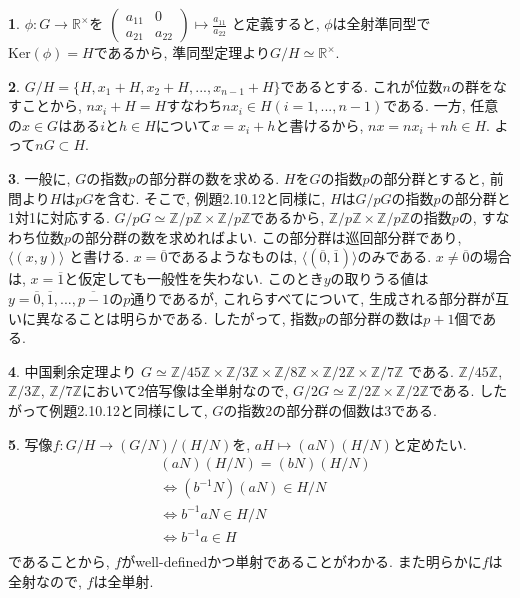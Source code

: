 \documentclass{article}
\theoremstyle{definition}
\newtheorem{ans}{}
\numberwithin{ans}{subsection}
\newcommand{\Z}[1]{\mathbb{Z}/#1\mathbb{Z}}
\newcommand{\Ker}[1]{\mathrm{Ker}(#1)}
\begin{document}
\begin{ans}
  $\phi: G \rightarrow \mathbb{R}^\times$を
  $\begin{pmatrix}
    a_{11} & 0 \\
    a_{21} & a_{22}
  \end{pmatrix} \mapsto \frac{a_{11}}{a_{22}}$
  と定義すると, $\phi$は全射準同型で$\Ker{\phi} = H$であるから,
  準同型定理より$G/H \simeq \mathbb{R}^\times$.
\end{ans}

\begin{ans}
  $G/H = \{H, x_1 + H, x_2 + H,..., x_{n-1} + H\}$であるとする.
  これが位数$n$の群をなすことから, $nx_i + H = H$すなわち$nx_i \in H (i = 1,..., n-1)$である.
  一方, 任意の$x \in G$はある$i$と$h \in H$について$x = x_i + h$と書けるから,
  $nx = nx_i + nh \in H$. よって$nG \subset H$.
\end{ans}

\begin{ans}
  一般に, $G$の指数$p$の部分群の数を求める.
  $H$を$G$の指数$p$の部分群とすると, 前問より$H$は$pG$を含む.
  そこで, 例題2.10.12と同様に, $H$は$G/pG$の指数$p$の部分群と1対1に対応する.
  $G/pG \simeq \Z{p} \times \Z{p}$であるから,
  $\Z{p} \times \Z{p}$の指数$p$の, すなわち位数$p$の部分群の数を求めればよい.
  この部分群は巡回部分群であり, $\langle(x, y)\rangle$ と書ける.
  $x = \overline{0}$であるようなものは, $\langle(\overline{0}, \overline{1})\rangle$のみである.
  $x \neq \overline{0}$の場合は, $x = \overline{1}$と仮定しても一般性を失わない.
  このとき$y$の取りうる値は$y = \overline{0}, \overline{1},..., \overline{p-1}$の$p$通りであるが,
  これらすべてについて, 生成される部分群が互いに異なることは明らかである.
  したがって, 指数$p$の部分群の数は$p + 1$個である.
\end{ans}

\begin{ans}
  中国剰余定理より
  $G \simeq \Z{45} \times \Z{3} \times \Z{8} \times \Z{2} \times \Z{7}$
  である. $\Z{45}$, $\Z{3}$, $\Z{7}$において$2$倍写像は全単射なので,
  $G/2G \simeq \Z{2} \times \Z{2}$である.
  したがって例題2.10.12と同様にして, $G$の指数$2$の部分群の個数は$3$である.
\end{ans}

\begin{ans}
  写像$f: G/H \rightarrow (G/N)/(H/N)$を,
  $aH \mapsto (aN)(H/N)$と定めたい.
  \begin{align*}
    &(aN)(H/N) = (bN)(H/N) \\
    &\Leftrightarrow (b^{-1}N)(aN) \in H/N \\
    &\Leftrightarrow b^{-1}aN \in H/N \\
    &\Leftrightarrow b^{-1}a \in H \\
  \end{align*}
  であることから, $f$がwell-definedかつ単射であることがわかる.
  また明らかに$f$は全射なので, $f$は全単射.
\end{ans}
\end{document}
